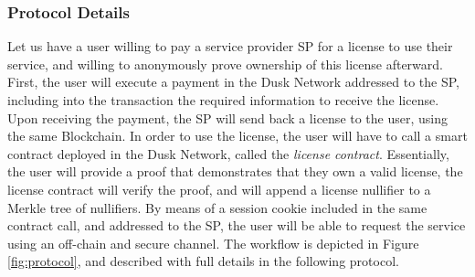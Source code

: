 \subsubsection{Protocol Details}

Let us have a user willing to pay a service provider SP for a license to use their service, and willing to anonymously prove ownership of this license afterward. First, the user will execute a payment in the Dusk Network addressed to the SP, including into the transaction the required information to receive the license. Upon receiving the payment, the SP will send back a license to the user, using the same Blockchain. In order to use the license, the user will have to call a smart contract deployed in the Dusk Network, called the \textit{license contract}. Essentially, the user will provide a proof that demonstrates that they own a valid license, the license contract will verify the proof, and will append a license nullifier to a Merkle tree of nullifiers. By means of a session cookie included in the same contract call, and addressed to the SP, the user will be able to request the service using an off-chain and secure channel. The workflow is depicted in Figure \ref{fig:protocol}, and described with full details in the following protocol.

